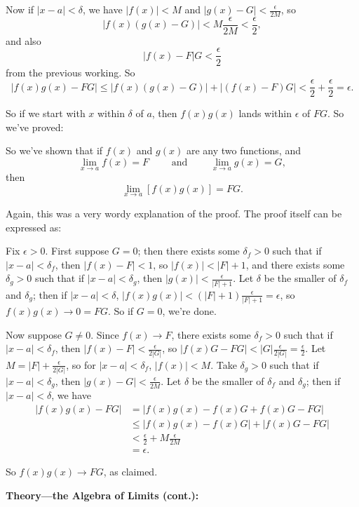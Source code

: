 \documentclass{article}
\begin{document}
Now if $|x-a|<\delta$, we have $|f(x)|<M$ and $|g(x)-G|<\frac{\epsilon}{2M}$, so
\[|f(x)(g(x)-G)|<M\frac{\epsilon}{2M}<\frac{\epsilon}{2},\]
and also
\[|f(x)-F|G<\frac{\epsilon}{2}\]
from the previous working. So
\[|f(x)g(x)-FG|\leq |f(x)(g(x)-G)| + |(f(x)-F)G| <\frac{\epsilon}{2}+\frac{\epsilon}{2}=\epsilon.\]

So if we start with $x$ within $\delta$ of $a$, then $f(x)g(x)$ lands within $\epsilon$ of $FG$. So we've proved:\bigskip

So we've shown that if $f(x)$ and $g(x)$ are any two functions, and
\[\lim_{x\to a}f(x)=F\qquad\mbox{ and }\qquad \lim_{x\to a}g(x)=G,\]
then
\[\lim_{x\to a}[f(x)g(x)] = FG.\]

\bigskip

Again, this was a very wordy explanation of the proof. The proof itself can be expressed as:\medskip

{\color{red}
Fix $\epsilon>0$. First suppose $G=0$; then there exists some $\delta_f>0$ such that if $|x-a|<\delta_f$, then $|f(x)-F|<1$, so $|f(x)|<|F|+1$, and there exists some $\delta_g>0$ such that if $|x-a|<\delta_g$, then $|g(x)|<\frac{\epsilon}{|F|+1}$. Let $\delta$ be the smaller of $\delta_f$ and $\delta_g$; then if $|x-a|<\delta$, $|f(x)g(x)|<(|F|+1)\frac{\epsilon}{|F|+1}=\epsilon$, so $f(x)g(x)\to 0=FG$. So if $G=0$, we're done.

Now suppose $G\neq 0$. Since $f(x)\to F$, there exists some $\delta_f>0$ such that if $|x-a|<\delta_f$, then $|f(x)-F|<\frac{\epsilon}{2|G|}$, so $|f(x)G-FG|<|G|\frac{\epsilon}{2|G|}=\frac{\epsilon}{2}$. Let $M=|F|+\frac{\epsilon}{2|G|}$, so for $|x-a|<\delta_f$, $|f(x)|<M$. Take $\delta_g>0$ such that if $|x-a|<\delta_g$, then $|g(x)-G|<\frac{\epsilon}{2M}$. Let $\delta$ be the smaller of $\delta_f$ and $\delta_g$; then if $|x-a|<\delta$, we have
\begin{align*}
	|f(x)g(x)-FG| &= |f(x)g(x)-f(x)G+f(x)G-FG|\\
	&\leq |f(x)g(x)-f(x)G|+|f(x)G-FG|\\
	&<\frac{\epsilon}{2}+M\frac{\epsilon}{2M}\\
	&=\epsilon.
\end{align*}

So $f(x)g(x)\to FG$, as claimed.
}

\clearpage










\textbf{Theory---the Algebra of Limits (cont.):}\medskip
\end{document}

